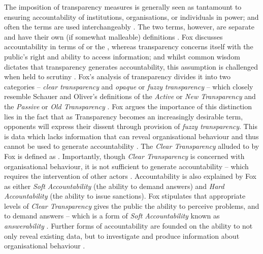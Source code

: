 The imposition of transparency measures is generally seen as tantamount to ensuring accountability of institutions, organisations, or individuals in power; and often the terms are used interchangeably \cite{fox_uncertain_2007, hood_accountability_2010}. The two terms, however, are separate and have their own (if somewhat malleable) definitions \cite{fox_uncertain_2007}.
%
Fox discusses accountability in terms of  or the , whereas transparency concerns itself with the public's right and ability to access information; and whilst common wisdom dictates that transparency generates accountability, this assumption is challenged when held to scrutiny \cite{fox_uncertain_2007}. Fox's analysis of transparency divides it into two categories -- \textit{clear transparency} and \textit{opaque} or \textit{fuzzy transparency} -- which closely resemble Schauer and Oliver's definitions of the \textit{Active} or \textit{New Transparency} and the \textit{Passive} or \textit{Old Transparency} \cite{schauer_transparency_2011, oliver_what_2004, fox_uncertain_2007}. Fox argues the importance of this distinction lies in the fact that as Transparency becomes an increasingly desirable term, opponents will express their dissent through provision of \textit{fuzzy transparency}. This is data which lacks information that can reveal organisational behaviour and thus cannot be used to generate accountability \cite{fox_uncertain_2007}.
%
The \textit{Clear Transparency} alluded to by Fox is defined as . Importantly, though \textit{Clear Transparency} is concerned with organisational behaviour, it is not sufficient to generate accountability -- which requires the intervention of other actors \cite{fox_uncertain_2007}. Accountability is also explained by Fox as either \textit{Soft Accountability} (the ability to demand answers) and \textit{Hard Accountability} (the ability to issue sanctions). Fox stipulates that appropriate levels of \textit{Clear Transparency} gives the public the ability to perceive problems, and to demand answers -- which is a form of \textit{Soft Accountability} known as \textit{answerability} \cite{fox_uncertain_2007}. Further forms of accountability are founded on the ability to not only reveal existing data, but to investigate and produce information about organisational behaviour \cite{fox_uncertain_2007}.
